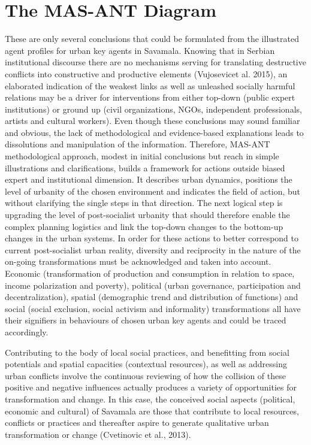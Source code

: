 \documentclass[11pt]{report}
\begin{document}
\section{The MAS-ANT Diagram}

These are only several conclusions that could be formulated from the illustrated agent profiles for urban key agents in Savamala. Knowing that in Serbian institutional discourse there are no mechanisms serving for translating destructive conflicts into constructive and productive elements (Vujosevicet al. 2015), an elaborated indication of the weakest links as well as unleashed socially harmful relations may be a driver for interventions from either top-down (public expert institutions) or ground up (civil organizations, NGOs, independent professionals, artists and cultural workers). Even though these conclusions may sound familiar and obvious, the lack of methodological and evidence-based explanations leads to dissolutions and manipulation of the information. Therefore, MAS-ANT methodological approach, modest in initial conclusions but reach in simple illustrations and clarifications, builds a framework for actions outside biased expert and institutional dimension. It describes urban dynamics, positions the level of urbanity of the chosen environment and indicates the field of action, but without clarifying the single steps in that direction. The next logical step is upgrading the level of post-socialist urbanity that should therefore enable the complex planning logistics and link the top-down changes to the bottom-up changes in the urban systems. In order for these actions to better correspond to current post-socialist urban reality, diversity and reciprocity in the nature of the on-going transformations must be acknowledged and taken into account. Economic (transformation of production and consumption in relation to space, income polarization and poverty), political (urban governance, participation and decentralization), spatial (demographic trend and distribution of functions) and social (social exclusion, social activism and informality) transformations all have their signifiers in behaviours of chosen urban key agents and could be traced accordingly.

Contributing to the body of local social practices, and benefitting from social potentials and spatial capacities (contextual resources), as well as addressing urban conflicts involve the continuous reviewing of how the collision of these positive and negative influences actually produces a variety of opportunities for transformation and change. In this case, the conceived social aspects (political, economic and cultural) of Savamala are those that contribute to local resources, conflicts or practices and thereafter aspire to generate qualitative urban transformation or change (Cvetinovic et al., 2013). 
\end{document}
